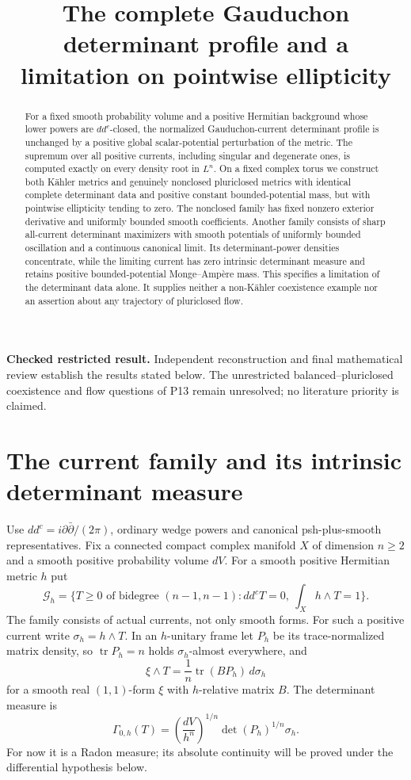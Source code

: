 \documentclass[11pt]{article}
\title{The complete Gauduchon determinant profile\newline
and a limitation on pointwise ellipticity}
\author{}\date{}
\newcommand{\ddc}{dd^c}
\newcommand{\tr}{\operatorname{tr}}
\newcommand{\Ga}{\mathcal G}
\theoremstyle{remark}\newtheorem{remark}[theorem]{Remark}
\begin{document}
\maketitle
\noindent\textbf{Checked restricted result.} Independent reconstruction
and final mathematical review establish the results stated below. The
unrestricted balanced--pluriclosed coexistence and flow questions of P13
remain unresolved; no literature priority is claimed.
\begin{abstract}
For a fixed smooth probability volume and a positive Hermitian background
whose lower powers are $dd^c$-closed,
the normalized Gauduchon-current determinant profile is unchanged by
a positive global scalar-potential perturbation of the metric.
The supremum over all positive currents, including singular and
degenerate ones, is computed exactly on every density root in $L^n$.
On a fixed complex torus we construct both K\"ahler metrics and genuinely
nonclosed pluriclosed metrics with identical complete determinant data
and positive constant bounded-potential mass, but with pointwise
ellipticity tending to zero. The nonclosed family has fixed nonzero
exterior derivative and uniformly bounded smooth coefficients.
Another family consists of sharp all-current determinant maximizers
with smooth potentials of uniformly bounded oscillation and a
continuous canonical limit. Its determinant-power densities concentrate, while the limiting
current has zero intrinsic determinant measure and retains positive
bounded-potential Monge--Amp\`ere mass.
This specifies a limitation of the determinant data alone. It supplies
neither a non-K\"ahler coexistence example nor an assertion about any
trajectory of pluriclosed flow.
\end{abstract}

\section{The current family and its intrinsic determinant measure}
Use $\ddc=i\partial\bar\partial/(2\pi)$, ordinary wedge powers and
canonical psh-plus-smooth representatives. Fix a connected compact
complex manifold $X$ of dimension $n\geq2$ and a smooth positive
probability volume $dV$. For a smooth positive Hermitian metric $h$ put
\[
 \Ga_h=\{T\geq0\text{ of bidegree }(n-1,n-1):
            \ddc T=0,\ \int_Xh\wedge T=1\}.
\]
The family consists of actual currents, not only smooth forms.
For such a positive current write $\sigma_h=h\wedge T$. In an
$h$-unitary frame let $P_h$ be its trace-normalized matrix density,
so $\tr P_h=n$ holds $\sigma_h$-almost everywhere, and
\[
 \xi\wedge T=\frac1n\tr(BP_h)\,d\sigma_h
\]
for a smooth real $(1,1)$-form $\xi$ with $h$-relative matrix $B$.
The determinant measure is
\[
 \Gamma_{0,h}(T)=
 \left(\frac{dV}{h^n}\right)^{1/n}
       \det(P_h)^{1/n}\sigma_h.
\]
For now it is a Radon measure; its absolute continuity will be proved
under the differential hypothesis below.
\end{document}
